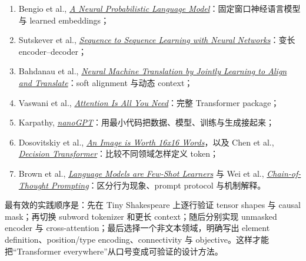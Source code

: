 \begin{enumerate}
  \item Bengio et al., \href{https://www.jmlr.org/papers/v3/bengio03a.html}{\emph{A Neural Probabilistic Language Model}}：固定窗口神经语言模型与 learned embeddings；
  \item Sutskever et al., \href{https://proceedings.neurips.cc/paper/2014/hash/a14ac55a4f27472c5d894ec1c3c743d2-Abstract.html}{\emph{Sequence to Sequence Learning with Neural Networks}}：变长 encoder--decoder；
  \item Bahdanau et al., \href{https://arxiv.org/abs/1409.0473}{\emph{Neural Machine Translation by Jointly Learning to Align and Translate}}：soft alignment 与动态 context；
  \item Vaswani et al., \href{https://arxiv.org/abs/1706.03762}{\emph{Attention Is All You Need}}：完整 Transformer package；
  \item Karpathy, \href{https://github.com/karpathy/nanoGPT}{\emph{nanoGPT}}：用最小代码把数据、模型、训练与生成接起来；
  \item Dosovitskiy et al., \href{https://arxiv.org/abs/2010.11929}{\emph{An Image is Worth 16x16 Words}}，以及 Chen et al., \href{https://arxiv.org/abs/2106.01345}{\emph{Decision Transformer}}：比较不同领域怎样定义 token；
  \item Brown et al., \href{https://arxiv.org/abs/2005.14165}{\emph{Language Models are Few-Shot Learners}} 与 Wei et al., \href{https://arxiv.org/abs/2201.11903}{\emph{Chain-of-Thought Prompting}}：区分行为现象、prompt protocol 与机制解释。
\end{enumerate}

最有效的实践顺序是：先在 Tiny Shakespeare 上逐行验证 tensor shapes 与 causal mask；再切换 subword tokenizer 和更长 context；随后分别实现 unmasked encoder 与 cross-attention；最后选择一个非文本领域，明确写出 element definition、position/type encoding、connectivity 与 objective。这样才能把“Transformer everywhere”从口号变成可验证的设计方法。


